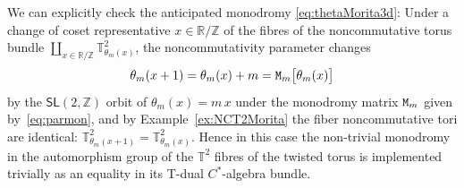 \documentclass[10pt,a4paper]{amsart}
\numberwithin{equation}{section}
\newcommand{\Z}{\zed}
\newcommand{\sfSL}{\mathsf{SL}}
\newcommand{\R}{\real}
\newcommand{\zed}{{\mathbb Z}} %
\newcommand{\real}{{\mathbb R}} %
\newcommand{\torus}{{\mathbb T}} %
\begin{document}
We can
explicitly check the anticipated monodromy \eqref{eq:thetaMorita3d}:
Under a change of coset representative $x\in\real/\Z$
of the fibres of the noncommutative torus bundle
$\coprod_{x\in\R/\Z} \torus^2_{\theta_m(x)}$, the noncommutativity parameter changes
\begin{gather}\label{eq:parthetamon}
\theta_m(x+1) = \theta_m(x)+m = {\tt M}_{m}\big[\theta_m(x)\big]
\end{gather}
by the $\sfSL(2,\Z)$ orbit of $\theta_m(x)=m\,x$ under the monodromy matrix ${\tt M}_{m}$ given by~\eqref{eq:parmon}, and by Example~\ref{ex:NCT2Morita} the fiber
noncommutative tori are identical:
$\torus^2_{\theta_m(x+1)}=\torus^2_{\theta_m(x)}$. Hence in this case the
non-trivial monodromy in
the automorphism group of the $\torus^2$ fibres of the twisted torus
is implemented trivially as an equality in its T-dual $C^*$-algebra
bundle.
\end{document}
